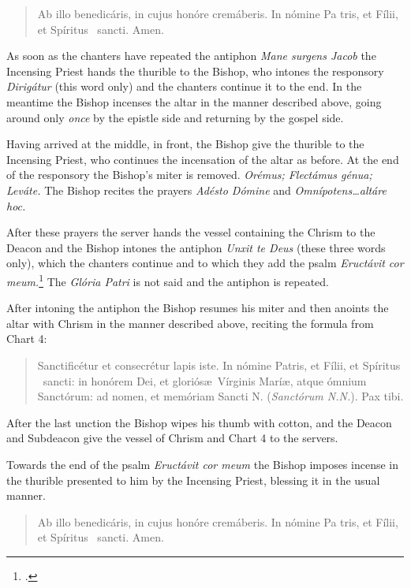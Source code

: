 \documentclass[letterpaper]{report}
\newcommand\blessincense{
\begin{quote}
   Ab illo benedicáris, in cujus honóre cremáberis. In nómine Pa\cross
    tris, et Fí\cross lii, et Spíritus \cross\ sancti. \rbar Amen.
\end{quote}
}
\begin{document}
{    \blessincense

    As soon as the chanters have repeated the antiphon \textit{Mane surgens
    Jacob} the Incensing Priest hands the thurible to the Bishop, who intones
    the responsory \textit{Dirig\'atur} (this word only) and the chanters
    continue it to the end. In the meantime the Bishop incenses the altar in
    the manner described above, going around only \textit{once} by the epistle
    side and returning by the gospel side.

    \rubric Having arrived at the middle, in front, the Bishop give the
    thurible to the Incensing Priest, who continues the incensation of the
    altar as before. At the end of the responsory the Bishop's miter is
    removed. \textit{Orémus; Flectámus génua; Leváte.} The Bishop recites the
    prayers \textit{Adésto Dómine} and \textit{Omnípotens\dots altáre hoc.}

    \rubric After these prayers the server hands the vessel containing the
    Chrism to the Deacon and the Bishop intones the antiphon \textit{Unxit te
    Deus} (these three words only), which the chanters continue and to which
    they add the psalm \textit{Eructávit cor meum.}\footcite[The antiphon
    \textit{Unxit te Deus} may be repested after each verse of this
    psalm.][footnote 1, p. 104.]{consecranda} The \textit{Gl\'oria Patri} is not
    said and the antiphon is repeated.

    After intoning the antiphon the Bishop resumes his miter and then anoints
    the altar with Chrism in the manner described above, reciting the formula
    from Chart 4:

    \begin{quote}
        Sancti\cross ficétur et conse\cross crétur lapis iste. In nómine
        Pa\cross tris, et Fí\cross lii, et Spíritus \cross\ sancti: in honórem
        Dei, et gloriós\ae\ Vírginis Marí\ae, atque ómnium Sanctórum: ad nomen,
        et memóriam Sancti N. (\textit{Sanctórum N.N.}). Pax tibi.
    \end{quote}

    After the last unction the Bishop wipes his thumb with cotton, and the
    Deacon and Subdeacon give the vessel of Chrism and Chart 4 to the servers.

    \rubric Towards the end of the psalm \textit{Eruct\'avit cor meum} the Bishop
    imposes incense in the thurible presented to him by the Incensing Priest,
    blessing it in the usual manner. 

    \blessincense

}
\end{document}
